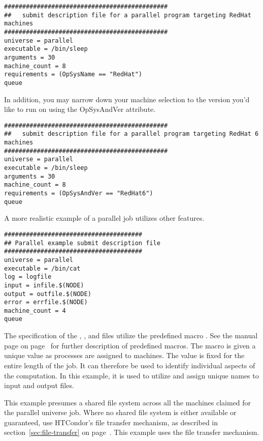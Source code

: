 \begin{verbatim}
#############################################
##   submit description file for a parallel program targeting RedHat machines
#############################################
universe = parallel
executable = /bin/sleep
arguments = 30
machine_count = 8
requirements = (OpSysName == "RedHat")
queue
\end{verbatim}


In addition, you may narrow down your machine selection to the version you'd like to run on using the OpSysAndVer attribute.

\begin{verbatim}
#############################################
##   submit description file for a parallel program targeting RedHat 6 machines
#############################################
universe = parallel
executable = /bin/sleep
arguments = 30
machine_count = 8
requirements = (OpSysAndVer == "RedHat6")
queue
\end{verbatim}

A more realistic example of a parallel job utilizes other features.

\begin{verbatim}
######################################
## Parallel example submit description file
######################################
universe = parallel
executable = /bin/cat
log = logfile
input = infile.$(NODE)
output = outfile.$(NODE)
error = errfile.$(NODE)
machine_count = 4
queue
\end{verbatim}

The specification of the , ,
and  files utilize the predefined macro 
.
See the 
manual page on page~\pageref{man-condor-submit} for further
description of predefined macros.
The  macro is given a
unique value as processes are assigned to machines.
The  value is fixed for the entire length of the job.
It can therefore be used to identify individual aspects of the computation.
In this example, it is used to utilize and assign unique names to
input and output files.

This example presumes a shared file system across all the machines
claimed for the parallel universe job. 
Where no shared file system is either available or guaranteed,
use HTCondor's file transfer mechanism,
as described in section~\ref{sec:file-transfer}
on page~\pageref{sec:file-transfer}.
This example uses the file transfer mechanism.

